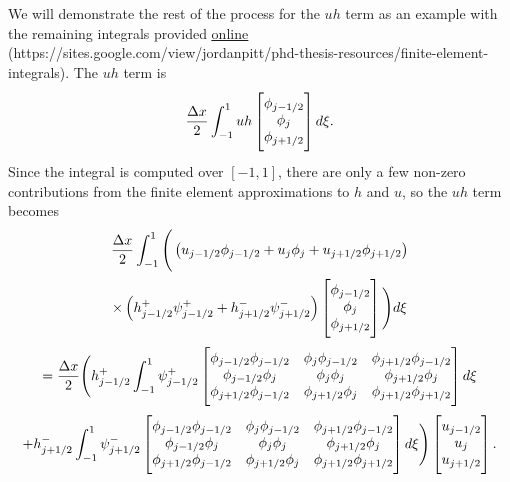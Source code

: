 We will demonstrate the rest of the process for the $uh$ term as an example with the remaining integrals provided \href{https://sites.google.com/view/jordanpitt/phd-thesis-resources/finite-element-integrals}{\color{blue}\underline{online}} (https://sites.google.com/view/jordanpitt/phd-thesis-resources/finite-element-integrals).
The $uh$ term is 
\begin{equation*}
\frac{\Delta x}{2}\int_{-1 }^{1} uh \begin{bmatrix} \TM
\phi_{j-1/2}\\\phi_j \\\phi_{j+1/2} \BM
\end{bmatrix} d\xi.
\end{equation*}
Since the integral is computed over $\left[-1,1\right]$, there are only a few non-zero contributions from the finite element approximations to $h$ and $u$, so the $uh$ term becomes
\begin{multline*}
\frac{\Delta x}{2}\int_{-1 }^{1}  \Bigg( \left(u_{j-1/2}\phi_{j-1/2} + u_{j}\phi_{j} + u_{j+1/2}\phi_{j+1/2}\right) \\ \times\left(h^+_{j-1/2}\psi^+_{j-1/2}  + h^-_{j+1/2}\psi^-_{j+1/2}\right) \begin{bmatrix} \TM
\phi_{j-1/2}\\\phi_j \\\phi_{j+1/2} \BM
\end{bmatrix} \Bigg) d\xi\\
=\frac{\Delta x}{2}\Bigg( h^+_{j-1/2} \int_{-1 }^{1} \psi^+_{j-1/2}  \begin{bmatrix} \TM
\phi_{j-1/2} \phi_{j-1/2} & \phi_{j}  \phi_{j-1/2}  & \phi_{j+1/2} \phi_{j-1/2}\\\phi_{j-1/2} \phi_{j} & \phi_{j} \phi_{j} &  \phi_{j + 1/2} \phi_{j}\\\phi_{j+1/2} \phi_{j-1/2} &  \phi_{j+1/2} \phi_{j} & \phi_{j+1/2} \phi_{j+1/2} \BM
\end{bmatrix} d\xi  \\ +  h^-_{j+1/2}\int_{-1 }^{1} \psi^-_{j+1/2} \begin{bmatrix} \TM
\phi_{j-1/2} \phi_{j-1/2} & \phi_{j}  \phi_{j-1/2}  & \phi_{j+1/2} \phi_{j-1/2}\\\phi_{j-1/2} \phi_{j} & \phi_{j} \phi_{j} &  \phi_{j + 1/2} \phi_{j}\\\phi_{j+1/2} \phi_{j-1/2} &  \phi_{j+1/2} \phi_{j} & \phi_{j+1/2} \phi_{j+1/2} \BM
\end{bmatrix} d\xi \Bigg)  \begin{bmatrix} \TM
u_{j-1/2}\\u_j \\u _{j+1/2} \BM
\end{bmatrix}.
\end{multline*}


